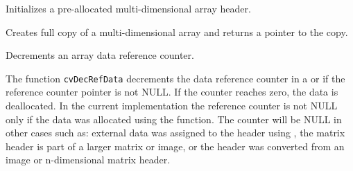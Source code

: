 Initializes a pre-allocated multi-dimensional array header.


\begin{description}
\end{description}

\label{CloneMatND}

Creates full copy of a multi-dimensional array and returns a pointer to the copy.


\begin{description}
\end{description}


\label{DecRefData}

Decrements an array data reference counter.


\begin{description}
\end{description}

The function \texttt{cvDecRefData} decrements the data reference counter in a  or
 if the reference counter pointer
is not NULL. If the counter reaches zero, the data is deallocated. In the
current implementation the reference counter is not NULL only if the data
was allocated using the  function. The counter will be NULL in other cases such as:
external data was assigned to the header using , the matrix
header is part of a larger matrix or image, or the header was converted from an image or n-dimensional matrix header. 


